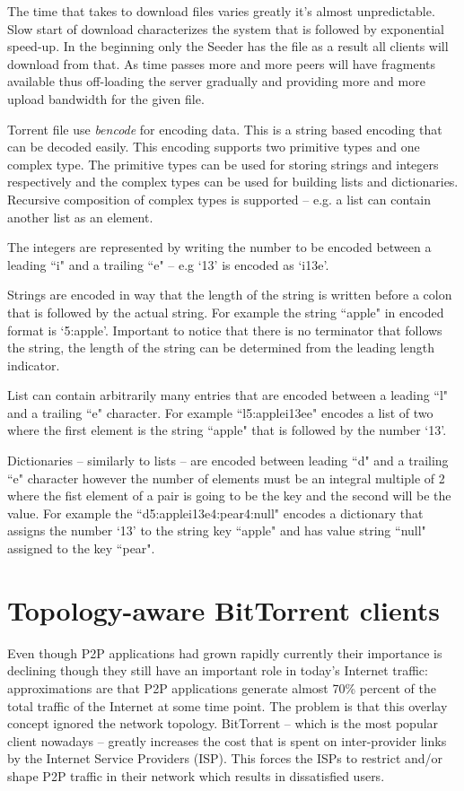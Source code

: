 \documentclass[a4paper]{article}
\begin{document}
The time that takes to download files varies greatly it's almost unpredictable. Slow start of download characterizes
the system that is followed by exponential speed-up. In the beginning only the Seeder has the file as a result all
clients will download from that. As time passes more and more peers will have fragments available thus off-loading the
server gradually and providing more and more upload bandwidth for the given file.

Torrent file use \emph{bencode} for encoding data. This is a string based encoding that can be decoded easily. This
encoding supports two primitive types and one complex type. The primitive types can be used for storing strings and
integers respectively and the complex types can be used for building lists and dictionaries. Recursive composition of
complex types is supported -- e.g. a list can contain another list as an element.

The integers are represented by writing the number to be encoded between  a leading ``i" and a trailing ``e" -- e.g
`13' is encoded as `i13e'.

Strings are encoded in way that the length of the string is written before a colon that is followed by the actual
string. For example the string ``apple" in encoded format is `5:apple'. Important to notice that there is no terminator
that follows the string, the length of the string can be determined from the leading length indicator.

List can contain arbitrarily many entries that are encoded between a leading ``l" and a trailing ``e" character. For
example ``l5:applei13ee" encodes a list of two where the first element is the string ``apple" that is followed by the
number `13'.

Dictionaries -- similarly to lists -- are encoded between leading ``d" and a trailing ``e" character however the number
of elements must be an integral multiple of 2 where the fist element of a pair is going to be the key and the second
will be the value. For example the ``d5:applei13e4:pear4:null" encodes a dictionary that assigns the number `13' to the
string key ``apple" and has value string ``null" assigned to the key ``pear".

\section{Topology-aware BitTorrent clients}

Even though P2P applications had grown rapidly currently their importance is declining though they still have an
important role in today's Internet traffic: approximations are that P2P applications generate almost 70\% percent of
the total traffic of the Internet at some time point. The problem is that this overlay concept ignored the network
topology. BitTorrent  -- which is the most popular client nowadays -- greatly increases the cost that is spent on
inter-provider links by the Internet Service Providers (ISP). This forces the ISPs to restrict and/or shape P2P traffic
in their network which results in dissatisfied users.
\end{document}
